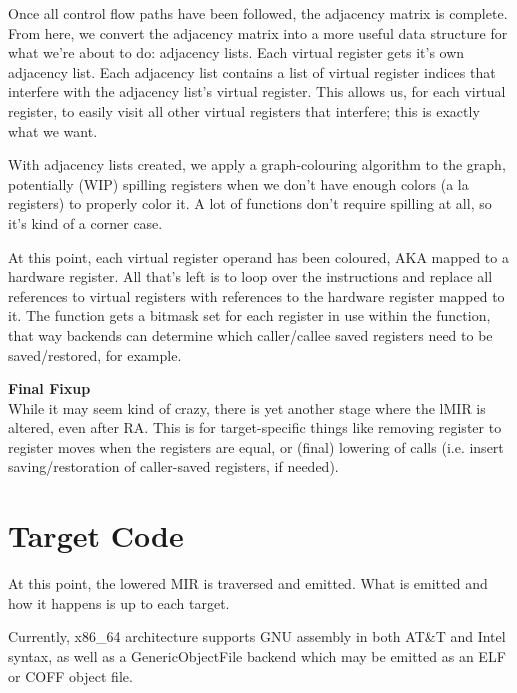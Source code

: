 \documentclass[12pt]{article}
\begin{document}
Once all control flow paths have been followed, the adjacency matrix is complete. From here, we convert the adjacency matrix into a more useful data structure for what we're about to do: adjacency lists. Each virtual register gets it's own adjacency list. Each adjacency list contains a list of virtual register indices that interfere with the adjacency list's virtual register. This allows us, for each virtual register, to easily visit all other virtual registers that interfere; this is exactly what we want.

With adjacency lists created, we apply a graph-colouring algorithm to the graph, potentially (WIP) spilling registers when we don't have enough colors (a la registers) to properly color it. A lot of functions don't require spilling at all, so it's kind of a corner case.

At this point, each virtual register operand has been coloured, AKA mapped to a hardware register. All that's left is to loop over the instructions and replace all references to virtual registers with references to the hardware register mapped to it. The function gets a bitmask set for each register in use within the function, that way backends can determine which caller/callee saved registers need to be saved/restored, for example.

\noindent\textbf{Final Fixup}\\
\noindent While it may seem kind of crazy, there is yet another stage where the lMIR is altered, even after RA. This is for target-specific things like removing register to register moves when the registers are equal, or (final) lowering of calls (i.e. insert saving/restoration of caller-saved registers, if needed).

\section{Target Code}
\label{sec:target-code}

At this point, the lowered MIR is traversed and emitted. What is emitted and how it happens is up to each target.

Currently, x86\_64 architecture supports GNU assembly in both AT\&T and Intel syntax, as well as a GenericObjectFile backend which may be emitted as an ELF or COFF object file.
\end{document}
